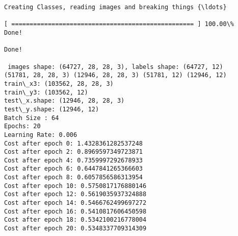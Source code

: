 \documentclass[11pt]{article}
\begin{document}
    \begin{Verbatim}[commandchars=\\\{\}]
Creating Classes, reading images and breaking things {\ldots}

[ ================================================== ] 100.00\%
Done!

Done!

 images shape: (64727, 28, 28, 3), labels shape: (64727, 12)
(51781, 28, 28, 3) (12946, 28, 28, 3) (51781, 12) (12946, 12)
train\_x3: (103562, 28, 28, 3)
train\_y3: (103562, 12)
test\_x.shape: (12946, 28, 28, 3)
test\_y.shape: (12946, 12)
Batch Size : 64
Epochs: 20
Learning Rate: 0.006  
Cost after epoch 0: 1.4328361282537248
Cost after epoch 2: 0.8969597349723871
Cost after epoch 4: 0.7359997292678933
Cost after epoch 6: 0.6447841265366603
Cost after epoch 8: 0.6057856586313954
Cost after epoch 10: 0.5750817176880146
Cost after epoch 12: 0.5619035937324888
Cost after epoch 14: 0.5466762499697272
Cost after epoch 16: 0.5410817606450598
Cost after epoch 18: 0.5342100216778004
Cost after epoch 20: 0.5348337709314309

    \end{Verbatim}

    \begin{center}
    \end{center}
    { \hspace*{\fill} \\}
    
\end{document}
